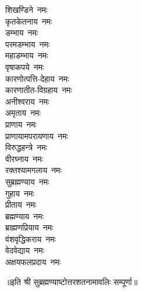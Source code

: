 \begin{multicols}{2}
\begin{flushleft}
शिखण्डिने~नमः\\
कृतकेतनाय~नमः\\
डम्भाय~नमः\\
परमडम्भाय~नमः\\
महाडम्भाय~नमः\hfill{}\\
वृषाकपये~नमः\\
कारणोत्पत्ति-देहाय~नमः\\
कारणातीत-विग्रहाय~नमः\\
अनीश्वराय~नमः\\
अमृताय~नमः\\
प्राणाय~नमः\\
प्राणायामपरायणाय~नमः\\
विरुद्धहन्त्रे~नमः\\
वीरघ्नाय~नमः\\
रक्तश्यामगलाय~नमः\hfill{}\\
सुब्रह्मण्याय~नमः\\
गुहाय~नमः\\
प्रीताय~नमः\\
ब्रह्मण्याय~नमः\\
ब्राह्मणप्रियाय~नमः\\
वंशवृद्धिकराय~नमः\\
वेदवेद्याय~नमः\\
अक्षयफलप्रदाय~नमः\\
\end{flushleft}
\end{multicols}

॥इति श्री सुब्रह्मण्याष्टोत्तरशतनामावलिः सम्पूर्णा॥